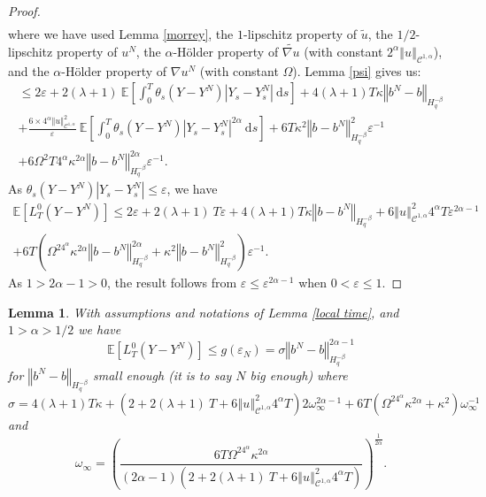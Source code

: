 \documentclass[11pt]{enstaPRE}
\newtheorem{lem}[theo]{Lemma}
\newcommand{\norme}[1]{\left\Vert #1\right\Vert}
\newcommand{\E}{\mathbb{E}}
\newcommand{\di}{\mathrm{d}}
\begin{document}
\begin{proof}
\begin{multline*}
    \end{multline*}
    where we have used Lemma \ref{morrey}, the $1$-lipschitz property of $\widetilde{u}$, the $1/2$-lipschitz property of $u^N$, the $\alpha$-Hölder property of $\widetilde{\nabla u}$ (with constant $2^\alpha\norme{u}_{\mathcal{C}^{1,\alpha}}$), and the $\alpha$-Hölder property of $\nabla u^N$ (with constant $\Omega$). Lemma \ref{psi} gives us:
    \begin{multline*}
    \leq 2\varepsilon + 2(\lambda + 1)\ \E\left[\int_0^T\theta_s\left(Y-Y^N\right)\left|Y_s - Y^N_s\right|\ \di s \right] + 4(\lambda + 1)T\kappa\norme{b^N-b}_{H^{-\beta}_{q}} \\  
    +\frac{6\times4^{\alpha}\norme{u}_{\mathcal{C}^{1,\alpha}}^2}{\varepsilon}\ \E\left[\int_0^T \theta_s\left(Y-Y^N\right)\left|Y_s - Y^N_s\right|^{2\alpha}\ \di s\right]+ 6T\kappa^2\norme{b-b^N}_{H^{-\beta}_{q}}^2\varepsilon^{-1}\\   + 6\Omega^2T4^{\alpha}\kappa^{2\alpha} \norme{b-b^N}_{H^{-\beta}_q}^{2\alpha}\varepsilon^{-1}.
    \end{multline*}
    As $\theta_s(Y-Y^N)\left|Y_s - Y^N_s\right|\leq \varepsilon$, we have    
    \begin{multline*}
    \E\left[L^0_T(Y-Y^N)\right]\leq 2\varepsilon + 2(\lambda + 1)\ T\varepsilon
    +4(\lambda + 1)T\kappa\norme{b-b^N}_{H^{-\beta}_{q}}+6\norme{u}_{\mathcal{C}^{1,\alpha}}^2 4^{\alpha}T \varepsilon^{2\alpha-1} \\ + 6T\left(\Omega^24^{\alpha}\kappa^{2\alpha} \norme{b-b^N}_{H^{-\beta}_q}^{2\alpha}+\kappa^2\norme{b-b^N}_{H^{-\beta}_{q}}^2\right)\varepsilon^{-1}.
    \end{multline*}    
    As $1>2\alpha-1>0$, the result follows from $\varepsilon\leq\varepsilon^{2\alpha-1}$ when $0<\varepsilon\leq1$.  
    
\end{proof}

\begin{lem}\label{key lemma}
    With assumptions and notations of Lemma \ref{local time}, and $1>\alpha>1/2$ we have
    \begin{equation}
    \E\left[L^0_T(Y-Y^N)\right]\leq g(\varepsilon_N) = \sigma\norme{b^N-b}_{H^{-\beta}_{q}}^{2\alpha-1}
    \end{equation}
    for $\norme{b^N-b}_{H^{-\beta}_{q}}$ small enough (it is to say $N$ big enough) where \begin{equation*}
    \sigma = 4(\lambda + 1)T\kappa + \left(2 + 2(\lambda + 1)\ T + 6\norme{u}_{\mathcal{C}^{1,\alpha}}^2 4^{\alpha}T\right) 2\omega_\infty^{2\alpha-1} + 6T\left(\Omega^24^{\alpha}\kappa^{2\alpha} +\kappa^2\right)\omega_\infty^{-1}
    \end{equation*} and \begin{equation*}
    \omega_\infty=\left(\frac{6T\Omega^24^{\alpha}\kappa^{2\alpha} }{(2\alpha-1)\left(2 + 2(\lambda + 1)\ T + 6\norme{u}_{\mathcal{C}^{1,\alpha}}^2 4^{\alpha}T\right)}\right)^{\frac{1}{2\alpha}}.
    \end{equation*}
\end{lem}
\end{document}
